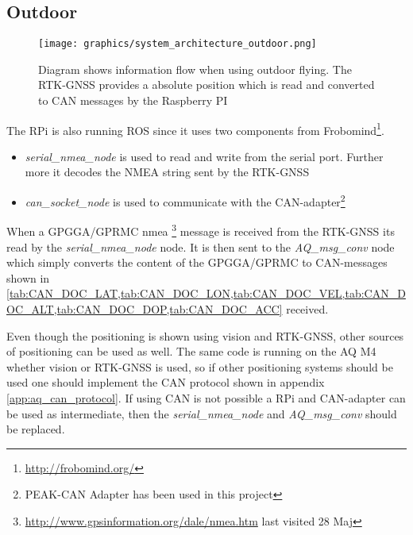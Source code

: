 \subsection{Outdoor}
\begin{figure}[H]
    \center
    \texttt{[image: graphics/system\_architecture\_outdoor.png]}
    \caption{Diagram shows information flow when using outdoor flying. The RTK-GNSS provides a absolute position which is read and converted to CAN messages by the Raspberry PI}
    \label{fig:outdoor_information_flow}
\end{figure}

The \ac{RPi} is also running \ac{ROS} since it uses two components from Frobomind\footnote{\url {http://frobomind.org/}}. \begin{itemize}
	\item \textit{serial\_nmea\_node} is used to read and write from the serial port. Further more it decodes the NMEA string sent by the \ac{RTK-GNSS}
	\item \textit{can\_socket\_node} is used to communicate with the \ac{CAN}-adapter\footnote{PEAK-CAN Adapter has been used in this project}
\end{itemize}

When a GPGGA/GPRMC nmea \footnote{\url{http://www.gpsinformation.org/dale/nmea.htm} last visited 28 Maj} message is received from the \ac{RTK-GNSS} its read by the \textit{serial\_nmea\_node} node. It is then sent to the \textit{AQ\_msg\_conv} node which simply converts the content of the GPGGA/GPRMC to CAN-messages shown in \cref{tab:CAN_DOC_LAT,tab:CAN_DOC_LON,tab:CAN_DOC_VEL,tab:CAN_DOC_ALT,tab:CAN_DOC_DOP,tab:CAN_DOC_ACC}  received.

Even though the positioning is shown using vision and \ac{RTK-GNSS}, other sources of positioning can be used as well. The same code is running on the AQ M4 whether vision or \ac{RTK-GNSS} is used, so if other positioning systems should be used one should implement the CAN protocol shown in appendix \ref{app:aq_can_protocol}.
If using CAN is not possible a \ac{RPi} and \ac{CAN}-adapter can be used as intermediate, then the \textit{serial\_nmea\_node} and \textit{AQ\_msg\_conv} should be replaced.
